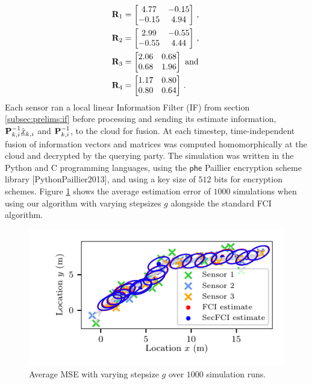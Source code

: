 \begin{equation}\label{eq:cloud_fusion:secfci_measurement_model_covariances}
    \begin{split}
        &{{\mathbf{R}}}_1 = 
        \begin{bmatrix}
            4.77 & -0.15\\
            -0.15 & 4.94
        \end{bmatrix}\,,\\
        &{{\mathbf{R}}}_2 = 
        \begin{bmatrix}
            2.99 & -0.55\\
            -0.55 & 4.44
        \end{bmatrix}\,,\\
        &{{\mathbf{R}}}_3 = 
        \begin{bmatrix}
            2.06 & 0.68\\
            0.68 & 1.96
        \end{bmatrix}\text{ and }\\
        &{{\mathbf{R}}}_4 = 
        \begin{bmatrix}
            1.17 & 0.80\\
            0.80 & 0.64
        \end{bmatrix}\,.
    \end{split}
\end{equation}
Each sensor ran a local linear Information Filter (IF) from section \ref{subsec:prelims:if} before processing and sending its estimate information, ${{\mathbf{P}}}_{k, i}^{-1}\hat{{\underline{x}}}_{k, i}$ and ${{\mathbf{P}}}_{k, i}^{-1}$, to the cloud for fusion. At each timestep, time-independent fusion of information vectors and matrices was computed homomorphically at the cloud and decrypted by the querying party. The simulation was written in the Python and C programming languages, using the $\mathsf{phe}$ Paillier encryption scheme library [PythonPaillier2013], and using a key size of $512$ bits for encryption schemes. Figure \ref{fig:cloud_fusion:secfci_sim_error} shows the average estimation error of $1000$ simulations when using our algorithm with varying stepsizes $g$ alongside the standard FCI algorithm. 
\begin{figure}[htbp]
    \centering
    \includegraphics{figures/fci_secfci_cmp.pdf}
    \caption{Average MSE with varying stepsize $g$ over $1000$ simulation runs.}
    \label{fig:cloud_fusion:secfci_sim_error}
 \end{figure}
